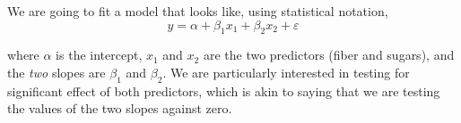 \documentclass[]{book}
\newenvironment{Shaded}{\begin{snugshade}}{\end{snugshade}}
\newcommand{\CommentTok}[1]{\textcolor[rgb]{0.56,0.35,0.01}{\textit{#1}}}
\newcommand{\DataTypeTok}[1]{\textcolor[rgb]{0.13,0.29,0.53}{#1}}
\newcommand{\KeywordTok}[1]{\textcolor[rgb]{0.13,0.29,0.53}{\textbf{#1}}}
\newcommand{\NormalTok}[1]{#1}
\newcommand{\OperatorTok}[1]{\textcolor[rgb]{0.81,0.36,0.00}{\textbf{#1}}}
\newcommand{\StringTok}[1]{\textcolor[rgb]{0.31,0.60,0.02}{#1}}
\begin{document}
We are going to fit a model that looks like, using statistical notation,
\begin{equation}
y = \alpha+\beta_1 x_1 +\beta_2 x_2 +\varepsilon
\label{eq:multiplelin}
\end{equation}

where \(\alpha\) is the intercept, \(x_1\) and \(x_2\) are the two predictors (fiber and sugars), and the \emph{two} slopes are \(\beta_1\) and \(\beta_2\). We are particularly interested in testing for significant effect of both predictors, which is akin to saying that we are testing the values of the two slopes against zero.

\begin{Shaded}
\end{Shaded}
\end{document}
